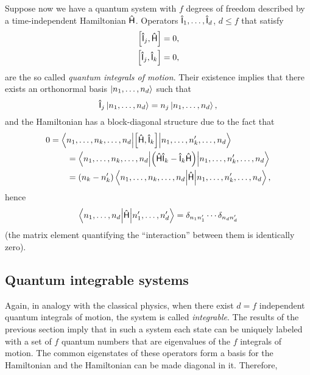 \documentclass[a4paper,11pt,twoside]{article}
\begin{document}
        Suppose now we have a quantum system with $f$ degrees of freedom described by a time-independent Hamiltonian $\mathsf{\hat{H}}$.
        Operators $\mathsf{\hat{I}}_{1},\dotsc,\mathsf{\hat{I}}_{d}$, $d\leq f$ that satisfy
        \begin{align}
            \left[{\mathsf{\hat{I}}_{j}},{\mathsf{\hat{H}}}\right]&=0,\nonumber\\
            \left[{\mathsf{\hat{I}}_{j}},{\mathsf{\hat{I}}_{k}}\right]&=0,
        \end{align}
        are the so called \emph{quantum integrals of motion}.
        Their existence implies that there exists an orthonormal basis $\left|{n_{1},\dotsc,n_{d}}\right\rangle$ such that 
        \begin{equation}
            \mathsf{\hat{I}}_{j}\left|{n_{1},\dotsc,n_{d}}\right\rangle=n_{j}\left|{n_{1},\dotsc,n_{d}}\right\rangle,
        \end{equation}
        and the Hamiltonian has a block-diagonal structure due to the fact that
        \begin{align}
            0&=\left\langle{n_{1},\dotsc,n_{k},\dotsc,n_{d}}\middle|{\left[{\mathsf{\hat{H}}},{\mathsf{\hat{I}}_{k}}\right]}\middle|{n_{1},\dotsc,n'_{k},\dotsc,n_{d}}\right\rangle\nonumber\\
            &\qquad=\left\langle{n_{1},\dotsc,n_{k},\dotsc,n_{d}}\middle|{\left(\mathsf{\hat{H}}\mathsf{\hat{I}}_{k}-\mathsf{\hat{I}}_{k}\mathsf{\hat{H}}\right)}\middle|{n_{1},\dotsc,n'_{k},\dotsc,n_{d}}\right\rangle\\
            &\qquad=\left(n_{k}-n'_{k}\right)\left\langle{n_{1},\dotsc,n_{k},\dotsc,n_{d}}\middle|{\mathsf{\hat{H}}}\middle|{n_{1},\dotsc,n'_{k},\dotsc,n_{d}}\right\rangle,\nonumber
        \end{align}
        hence
        \begin{equation}
            \left\langle{n_{1},\dotsc,n_{d}}\middle|{\mathsf{\hat{H}}}\middle|{n'_{1},\dotsc,n'_{d}}\right\rangle=\delta_{n_{1}n'_{1}}\dotsb\delta_{n_{d}n'_{d}}
        \end{equation}
         (the matrix element quantifying the ``interaction'' between them is identically zero).

    \subsection{Quantum integrable systems}
        Again, in analogy with the classical physics, when there exist $d=f$ independent quantum integrals of motion, the system is called \emph{integrable}.
        The results of the previous section imply that in such a system each state can be uniquely labeled with a set of $f$ quantum numbers that are eigenvalues of the $f$ integrals of motion.
        The common eigenstates of these operators form a basis for the Hamiltonian and the Hamiltonian can be made diagonal in it.
        Therefore, 
\end{document}

